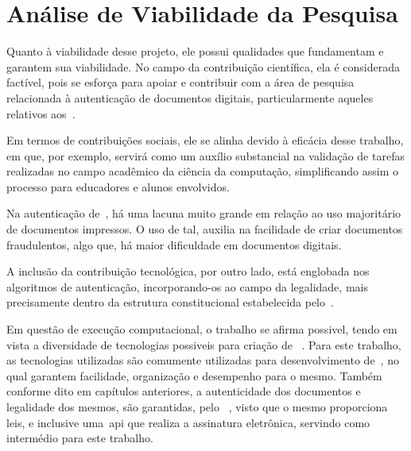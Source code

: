 \newcommand{\footnotegantt}{
    \footnote{O Gráfico de Gantt, também conhecido como Diagrama de Gantt,
        é uma ferramenta visual para controlar o cronograma de um projeto ou
        de uma programação de produção, ajudando a avaliar os prazos de
        entrega e os recursos críticos.
        Disponível em:
        \url{https://www.nomus.com.br/blog-industrial/grafico-de-gantt/}
    }
}
\chapter{Análise de Viabilidade da Pesquisa}
\label{ch:analise-de-viabilidade-da-pesquisa}

Quanto à viabilidade desse projeto, ele possui qualidades que fundamentam e
garantem sua viabilidade.
No campo da contribuição científica, ela é considerada factível, pois se esforça para
apoiar e contribuir com a área de pesquisa relacionada à autenticação de documentos
digitais, particularmente aqueles relativos aos~.

Em termos de contribuições sociais, ele se alinha devido à eficácia desse trabalho,
em que, por exemplo, servirá como um auxílio substancial na validação de tarefas
realizadas no campo acadêmico da ciência da computação, simplificando assim o
processo para educadores e alunos envolvidos.

Na autenticação de~, há uma lacuna muito grande em relação ao
uso majoritário de documentos impressos.
O uso de tal, auxilia na facilidade de criar documentos fraudulentos, algo que,
há maior dificuldade em documentos digitais.

A inclusão da contribuição tecnológica, por outro lado, está englobada nos algoritmos
de autenticação, incorporando-os ao campo da legalidade, mais precisamente dentro
da estrutura constitucional estabelecida pelo~\citeauthor*{govbr2020}.

Em questão de execução computacional, o trabalho se afirma possivel,
tendo em vista a diversidade de tecnologias possiveis para criação de
~.
Para este trabalho, as tecnologias utilizadas são comumente utilizadas para
desenvolvimento de~, no qual garantem facilidade, organização
e desempenho para o mesmo.
Também conforme dito em capítulos anteriores, a autenticidade dos documentos
e legalidade dos mesmos, são garantidas, pelo ~\citeauthor*{govbr2020},
visto que o mesmo proporciona leis, e inclusive uma~\acrshort{api} que
realiza a assinatura eletrônica, servindo como intermédio para este trabalho.

